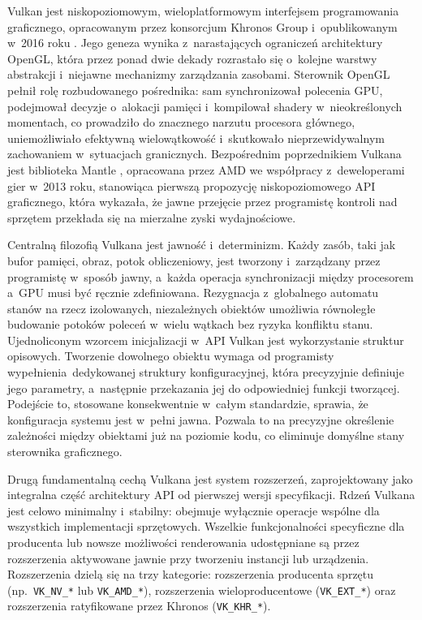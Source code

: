 Vulkan jest niskopoziomowym, wieloplatformowym interfejsem programowania graficznego, 
opracowanym przez konsorcjum Khronos Group i~opublikowanym w~2016 roku \cite{vulkan-spec}. 
Jego geneza wynika z~narastających ograniczeń architektury OpenGL, 
która przez ponad dwie dekady rozrastało się o~kolejne warstwy abstrakcji
i~niejawne mechanizmy zarządzania zasobami. Sterownik OpenGL pełnił rolę rozbudowanego 
pośrednika: sam synchronizował polecenia GPU, podejmował decyzje o~alokacji pamięci
i~kompilował shadery w~nieokreślonych momentach, co prowadziło do znacznego narzutu procesora głównego, 
uniemożliwiało efektywną wielowątkowość i~skutkowało nieprzewidywalnym zachowaniem w~sytuacjach granicznych. 
Bezpośrednim poprzednikiem Vulkana jest biblioteka Mantle \cite{amdmantle2015}, opracowana przez AMD we współpracy z~deweloperami 
gier w~2013 roku, stanowiąca pierwszą propozycję niskopoziomowego API graficznego, która wykazała, 
że jawne przejęcie przez programistę kontroli nad sprzętem przekłada się na mierzalne zyski wydajnościowe.

Centralną filozofią Vulkana jest jawność i~determinizm. Każdy zasób, taki jak bufor pamięci, 
obraz, potok obliczeniowy, jest tworzony i~zarządzany przez programistę w~sposób jawny, 
a~każda operacja synchronizacji między procesorem a~GPU musi być ręcznie zdefiniowana. 
Rezygnacja z~globalnego automatu stanów na rzecz izolowanych, niezależnych obiektów umożliwia 
równoległe budowanie potoków poleceń w~wielu wątkach bez ryzyka konfliktu stanu. 
Ujednoliconym wzorcem inicjalizacji w~API Vulkan jest wykorzystanie struktur opisowych. 
Tworzenie dowolnego obiektu wymaga od programisty wypełnienia~dedykowanej struktury konfiguracyjnej, 
która precyzyjnie definiuje jego parametry, a~następnie przekazania jej do odpowiedniej funkcji tworzącej. 
Podejście to, stosowane konsekwentnie w~całym standardzie, sprawia, że konfiguracja systemu jest w~pełni jawna. 
Pozwala to na precyzyjne określenie zależności między obiektami już na poziomie kodu, co eliminuje domyślne stany 
sterownika graficznego.

Drugą fundamentalną cechą Vulkana jest system rozszerzeń, zaprojektowany jako integralna 
część architektury API od pierwszej wersji specyfikacji. Rdzeń Vulkana jest celowo minimalny i~stabilny: 
obejmuje wyłącznie operacje wspólne dla wszystkich implementacji sprzętowych. 
Wszelkie funkcjonalności specyficzne dla producenta lub nowsze możliwości renderowania 
udostępniane są przez rozszerzenia aktywowane jawnie przy tworzeniu instancji lub urządzenia. 
Rozszerzenia dzielą się na trzy kategorie: rozszerzenia producenta sprzętu (np.\ \texttt{VK\_NV\_*} lub
\texttt{VK\_AMD\_*}), rozszerzenia wieloproducentowe (\texttt{VK\_EXT\_*}) oraz rozszerzenia
ratyfikowane przez Khronos (\texttt{VK\_KHR\_*}).

